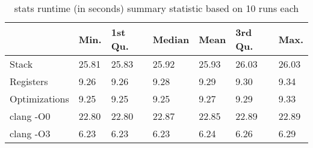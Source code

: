 \begin{table}[h!]
\centering
\begin{tabular}{p{}p{}p{}p{}p{}p{}p{}}
  \hline
 & Min. & 1st Qu. & Median & Mean & 3rd Qu. & Max. \\ 
  \hline
Stack & 25.81 & 25.83 & 25.92 & 25.93 & 26.03 & 26.03 \\ 
  Registers & 9.26 & 9.26 & 9.28 & 9.29 & 9.30 & 9.34 \\ 
  Optimizations & 9.25 & 9.25 & 9.25 & 9.27 & 9.29 & 9.33 \\ 
  clang -O0 & 22.80 & 22.80 & 22.87 & 22.85 & 22.89 & 22.89 \\ 
  clang -O3 & 6.23 & 6.23 & 6.23 & 6.24 & 6.26 & 6.29 \\ 
   \hline
\end{tabular}
\caption{stats runtime (in seconds) summary statistic based on 10 runs each}
\end{table}
